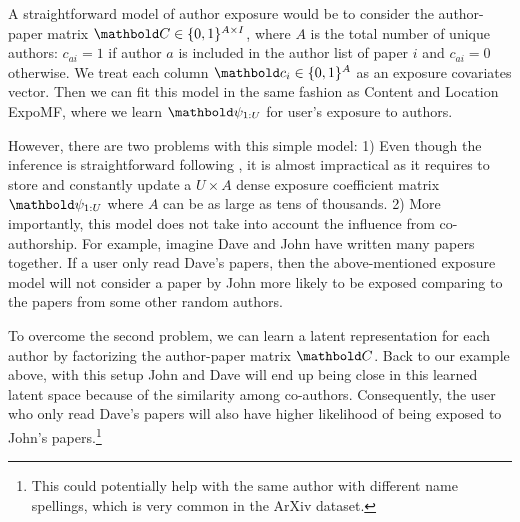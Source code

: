 A straightforward model of author exposure would be to consider the author-paper matrix $\mbC \in \{0, 1\}^{A\times I}$, where $A$ is the total number of unique authors: $c_{ai} = 1$ if author $a$ is included in the author list of paper $i$ and $c_{ai} = 0$ otherwise. We treat each column $\mbc_i \in \{0, 1\}^A$ as an exposure covariates vector. Then we can fit this model in the same fashion as Content and Location ExpoMF, where we learn $\mb\psi_{1:U}$ for user's exposure to authors.  

However, there are two problems with this simple model: 1) Even though the inference is straightforward following , it is almost impractical as it requires to store and constantly update a $U\times A$ dense exposure coefficient matrix $\mb\psi_{1:U}$ where $A$ can be as large as tens of thousands. 2) More importantly, this model does not take into account the influence from co-authorship. For example, imagine Dave and John have written many papers together. If a user only read Dave's papers, then the above-mentioned exposure model will not consider a paper by John more likely to be exposed comparing to the papers from some other random authors. 

To overcome the second problem, we can learn a latent representation for each author by factorizing the author-paper matrix $\mbC$. Back to our example above, with this setup John and Dave will end up being close in this learned latent space because of the similarity among co-authors. Consequently, the user who only read Dave's papers will also have higher likelihood of being exposed to John's papers.\footnote{This could potentially help with the same author with different name spellings, which is very common in the ArXiv dataset.} 

